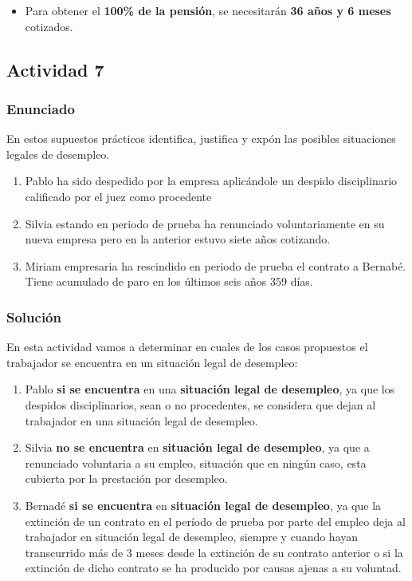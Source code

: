 \begin{enumerate}[label=\alph*)]
\begin{enumerate}
\begin{itemize}
            \item Para obtener el \textbf{100\% de la pensión}, se necesitarán \textbf{36 años y 6 meses} cotizados.
        \end{itemize}
    \end{enumerate}
\end{enumerate}

\subsection{Actividad 7}

\subsubsection{Enunciado}

En estos supuestos prácticos identifica, justifica y expón las posibles situaciones legales de desempleo.

\begin{enumerate}[label=\alph*)]
    \item Pablo ha sido despedido por la empresa aplicándole un despido disciplinario calificado por el juez como procedente
    \item Silvia estando en periodo de prueba ha renunciado voluntariamente en su nueva empresa pero en la anterior estuvo siete años cotizando.
    \item Miriam empresaria ha rescindido  en periodo de prueba el contrato a Bernabé. Tiene acumulado de paro en los últimos seis años 359 días.
\end{enumerate}

\subsubsection{Solución}
En esta actividad vamos a determinar en cuales de los casos propuestos el trabajador se encuentra en un situación legal de desempleo:

\begin{enumerate}[label=\alph*)]
    \item Pablo \textbf{si se encuentra} en una \textbf{situación legal de desempleo}, ya que los despidos disciplinarios, sean o no procedentes, se considera que dejan al trabajador en una situación legal de desempleo.
    \item Silvia \textbf{no se encuentra} en \textbf{situación legal de desempleo}, ya que a renunciado voluntaria a su empleo, situación que en ningún caso, esta cubierta por la prestación por desempleo.
    \item Bernadé \textbf{si se encuentra} en \textbf{situación legal de desempleo}, ya que la extinción de un contrato en el período de prueba por parte del empleo deja al trabajador en situación legal de desempleo, siempre y cuando hayan transcurrido más de 3 meses desde la extinción de su contrato anterior o si la extinción de dicho contrato se ha producido por causas ajenas a su voluntad.
\end{enumerate}


